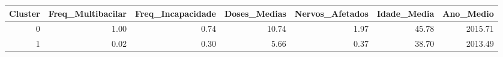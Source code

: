 \begin{tabular}{rrrrrrr}
\toprule
Cluster & Freq\_Multibacilar & Freq\_Incapacidade & Doses\_Medias & Nervos\_Afetados & Idade\_Media & Ano\_Medio \\
\midrule
0 & 1.00 & 0.74 & 10.74 & 1.97 & 45.78 & 2015.71 \\
1 & 0.02 & 0.30 & 5.66 & 0.37 & 38.70 & 2013.49 \\
\bottomrule
\end{tabular}
